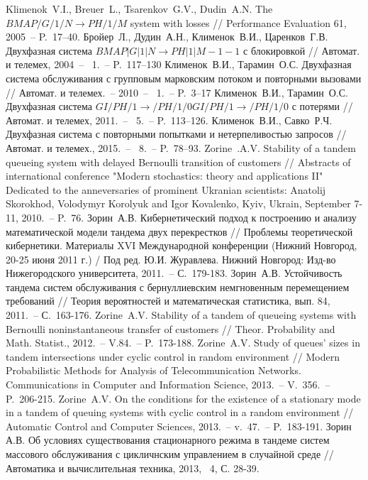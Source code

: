 \documentclass[a4paper,12pt,russian]{extarticle}
\newcommand{\No}{\textnumero}
\begin{document}
\begin{thebibliography}{99}
 Klimenok~V.I., Breuer~L., Tsarenkov~G.V., Dudin~A.N. The $BMAP/G/1/N \to PH/1/M$ system with losses // Performance Evaluation 61, 2005~-- P.~17–40.
 Бройер~Л., Дудин~А.Н., Клименок~В.И., Царенков~Г.В. Двухфазная система $BMAP|G|1|N \to PH|1|M-1-1$ с блокировкой // Автомат. и телемех, 2004~-- \No {}~1.~-- P.~117–130
 Клименок~В.И., Тарамин~О.С. Двухфазная система обслуживания с групповым марковским потоком и повторными вызовами // Автомат. и телемех.~-- 2010~-- \No~1.~-- P.~3–17 
 Клименок~В.И., Тарамин~О.С. Двухфазная система $GI/PH/1 \to /PH/1/0GI/PH/1 \to /PH/1/0$ с потерями // Автомат. и телемех, 2011.~-- \No{}~5.~-- P.~113–126.
 Клименок~В.И., Савко~Р.Ч. Двухфазная система с повторными попытками и нетерпеливостью запросов // Автомат. и телемех., 2015.~-- \No{}~8.~-- P.~78–93. 
 Zorine~.A.V. Stability of a tandem queueing system with delayed Bernoulli transition of customers // Abstracts of international conference "Modern stochastics: theory and applications II" Dedicated to the anneversaries of prominent Ukranian scientists: Anatolij Skorokhod, Volodymyr Korolyuk and Igor Kovalenko, Kyiv, Ukrain, September 7-11, 2010.~-- P.~76.
 Зорин~А.В. Кибернетический подход к построению и анализу математической модели тандема двух перекрестков // Проблемы теоретической кибернетики. Материалы XVI Международной конференции (Нижний Новгород, 20-25 июня 2011 г.) / Под ред. Ю.И. Журавлева. Нижний Новгород: Изд-во Нижегородского университета, 2011.~-- С.~179-183.
 Зорин~А.В. Устойчивость тандема систем обслуживания с бернуллиевским немгновенным перемещением требований // Теория вероятностей и математическая статистика, вып. 84, 2011.~-- С.~163-176.
 Zorine~A.V. Stability of a tandem of queueing systems with Bernoulli noninstantaneous transfer of customers // Theor. Probability and Math. Statist., 2012.~-- V.84.~-- P.~173-188.
 Zorine~A.V. Study of queues’ sizes in tandem intersections under cyclic control in random environment // Modern Probabilistic Methods for Analysis of Telecommunication Networks. Communications in Computer and Information Science, 2013.~-- V.~356.~-- P.~206-215.
 Zorine~A.V. On the conditions for the existence of a stationary mode in a tandem of queuing systems with cyclic control in a random environment // Automatic Control and Computer Sciences, 2013.~-- v.~47.~-- P.~183-191.
Зорин А.В. Об условиях существования стационарного режима в тандеме систем массового обслуживания с цикличнским управлением в случайной среде // Автоматика и вычислительная техника, 2013, \No{}~4, С. 28-39.


\end{thebibliography}
\end{document}
